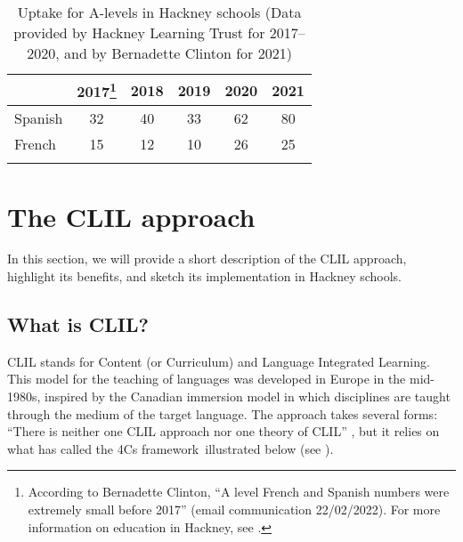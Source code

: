 \documentclass[output=paper]{langscibook}
\begin{document}
\begin{table}
\caption{\label{tab:labeau:2}Uptake for A-levels in Hackney schools (Data provided by Hackney Learning Trust for 2017--2020, and by Bernadette Clinton for 2021)}
\begin{tabular}{l *5{c}}
\lsptoprule
& {2017\footnote{According to Bernadette Clinton, “A level French and Spanish numbers were extremely small before 2017” (email communication 22/02/2022). For more information on education in Hackney, see \citet{BoyleHumphreys2012}.}} & {2018} & {2019} & {2020} & {2021}\\
\midrule
Spanish & 32 & 40 & 33 & 62 & 80\\
French & 15 & 12 & 10 & 26 & 25\\
\lspbottomrule
\end{tabular}
\end{table}

\section{The CLIL approach}

In this section, we will provide a short description of the CLIL approach, highlight its benefits, and sketch its implementation in Hackney schools.

\subsection{What is CLIL?}

CLIL stands for Content (or Curriculum) and Language Integrated Learning. This model for the teaching of languages was developed in Europe in the mid-1980s, inspired by the Canadian immersion model in which disciplines are taught through the medium of the target language. The approach takes several forms: ``There is neither one CLIL approach nor one theory of CLIL'' \citep[101]{Coyle2008}, but it relies on what \citet{Coyle2006} has called the 4Cs framework~illustrated below (see ).
\end{document}
